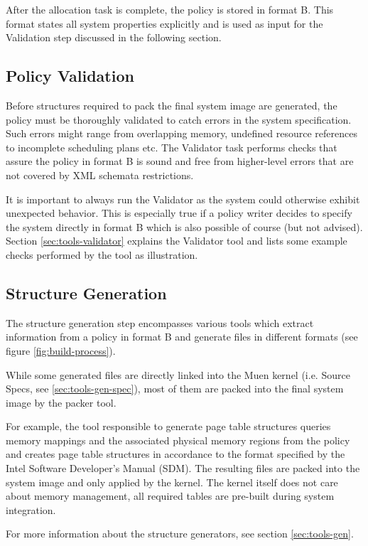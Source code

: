 \documentclass[a4paper,twoside,titlepage]{article}
\begin{document}
After the allocation task is complete, the policy is stored in format B. This
format states all system properties explicitly and is used as input for the
Validation step discussed in the following section.

\subsection{Policy Validation}
\label{subsec:policy_validation}
Before structures required to pack the final system image are generated, the
policy must be thoroughly validated to catch errors in the system
specification.  Such errors might range from overlapping memory, undefined
resource references to incomplete scheduling plans etc. The Validator task
performs checks that assure the policy in format B is sound and free from
higher-level errors that are not covered by XML schemata restrictions.

It is important to always run the Validator as the system could otherwise
exhibit unexpected behavior. This is especially true if a policy writer decides
to specify the system directly in format B which is also possible of course
(but not advised).  Section \ref{sec:tools-validator} explains the Validator
tool and lists some example checks performed by the tool as illustration.

\subsection{Structure Generation}
The structure generation step encompasses various tools which extract
information from a policy in format B and generate files in different formats
(see figure \ref{fig:build-process}).

While some generated files are directly linked into the Muen kernel (i.e.
Source Specs, see \ref{sec:tools-gen-spec}), most of them are packed into the
final system image by the packer tool.

For example, the tool responsible to generate page table structures queries
memory mappings and the associated physical memory regions from the policy and
creates page table structures in accordance to the format specified by the
Intel Software Developer's Manual (SDM). The resulting files are packed into
the system image and only applied by the kernel. The kernel itself does not
care about memory management, all required tables are pre-built during system
integration.

For more information about the structure generators, see section
\ref{sec:tools-gen}.
\end{document}
